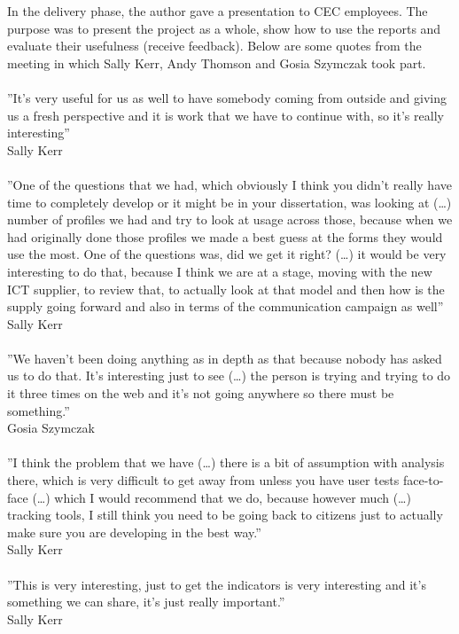 In the delivery phase, the author gave a presentation to CEC employees. The purpose was to present the project as a whole, show how to use the reports and evaluate their usefulness (receive feedback). Below are some quotes from the meeting in which Sally Kerr, Andy Thomson and Gosia Szymczak took part.\\\\
''It’s very useful for us as well to have somebody coming from outside and giving us a fresh perspective and it is work that we have to continue with, so it’s really interesting''\\
Sally Kerr\\\\
''One of the questions that we had, which obviously I think you didn’t really have time to completely develop or it might be in your dissertation, was looking at (…) number of profiles we had and try to look at usage across those, because when we had originally done those profiles we made a best guess at the forms they would use the most. One of the questions was, did we get it right? (…) it would be very interesting to do that, because I think we are at a stage, moving with the new ICT supplier, to review that, to actually look at that model and then how is the supply going forward and also in terms of the communication campaign as well''\\
Sally Kerr\\\\
''We haven’t been doing anything as in depth as that because nobody has asked us to do that. It’s interesting just to see (…) the person is trying and trying to do it three times on the web and it’s not going anywhere so there must be something.''\\
Gosia Szymczak\\\\
''I think the problem that we have (…) there is a bit of assumption with analysis there, which is very difficult to get away from unless you have user tests face-to-face (…) which I would recommend that we do, because however much (…) tracking tools, I still think you need to be going back to citizens just to actually make sure you are developing in the best way.''\\
Sally Kerr\\\\
''This is very interesting, just to get the indicators is very interesting and it’s something we can share, it’s just really important.''\\
Sally Kerr\\\\
